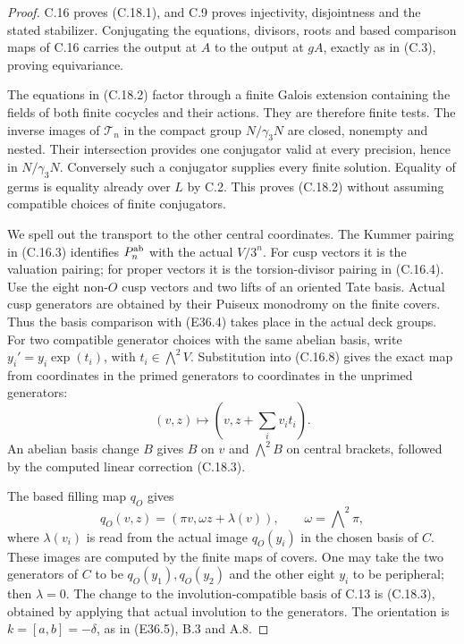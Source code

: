 \begin{proof}
C.16 proves (C.18.1), and C.9 proves injectivity,
disjointness and the stated stabilizer.
Conjugating the equations, divisors, roots and
based comparison maps of C.16 carries the
output at $A$ to the output at $gA$, exactly
as in (C.3), proving equivariance.

The equations in (C.18.2) factor through a
finite Galois extension containing the fields
of both finite cocycles and their actions.
They are therefore finite tests.
The inverse images of $\mathcal T_n$ in the
compact group $N/\gamma_3N$ are closed,
nonempty and nested.  Their intersection
provides one conjugator valid at every
precision, hence in $N/\gamma_3N$.
Conversely such a conjugator supplies
every finite solution.
Equality of germs is equality already over
$L$ by C.2.  This proves (C.18.2) without
assuming compatible choices of finite
conjugators.

We spell out the transport to the other
central coordinates.  The Kummer pairing
in (C.16.3) identifies $P_n^{\rm ab}$
with the actual $V/3^n$.
For cusp vectors it is the valuation
pairing; for proper vectors it is the
torsion-divisor pairing in (C.16.4).
Use the eight non-$O$ cusp vectors and
two lifts of an oriented Tate basis.
Actual cusp generators are obtained by
their Puiseux monodromy on the finite
covers.  Thus the basis comparison with
(E36.4) takes place in the actual deck
groups.  For two compatible generator
choices with the same abelian basis,
write $y_i'=y_i\exp(t_i)$, with
$t_i\in\bigwedge^2V$.  Substitution into
(C.16.8) gives the exact map from coordinates
in the primed generators to coordinates
in the unprimed generators:
\[
              (v,z)\longmapsto
                    (v,z+\sum_i v_i t_i).                 \tag{C.18.3}
\]
An abelian basis change $B$ gives $B$ on
$v$ and $\bigwedge^2B$ on central brackets,
followed by the computed linear correction
(C.18.3).

The based filling map $q_O$ gives
\[
 q_O(v,z)=(\pi v,\omega z+\lambda(v)),\qquad
               \omega=\bigwedge\nolimits^2\pi,            \tag{C.18.4}
\]
where $\lambda(v_i)$ is read from the
actual image $q_O(y_i)$ in the chosen
basis of $C$.  These images are computed
by the finite maps of covers.
One may take the two generators of $C$
to be $q_O(y_1),q_O(y_2)$ and the other
eight $y_i$ to be peripheral; then
$\lambda=0$.  The change to the
involution-compatible basis of C.13 is
(C.18.3), obtained by applying that
actual involution to the generators.
The orientation is
$k=[a,b]=-\delta$, as in (E36.5),
B.3 and A.8.


\end{proof}
